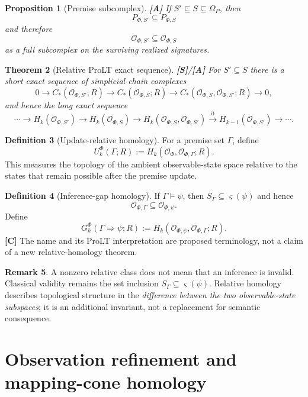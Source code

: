 \documentclass[11pt]{article}
\newtheorem{theorem}{Theorem}[section]
\newtheorem{proposition}[theorem]{Proposition}
\theoremstyle{definition}
\newtheorem{definition}[theorem]{Definition}
\newtheorem{remark}[theorem]{Remark}
\newcommand{\Om}{\Omega_P}
\newcommand{\truth}{\varsigma}
\newcommand{\OX}{\mathcal O}
\newcommand{\statusS}{\textbf{[S]}}
\newcommand{\statusA}{\textbf{[A]}}
\newcommand{\statusC}{\textbf{[C]}}
\begin{document}
\begin{proposition}[Premise subcomplex]\label{prop:premise}
\statusA\;
If $S'\subseteq S\subseteq\Om$, then
\[
P_{\Phi,S'}\subseteq P_{\Phi,S}
\]
and therefore
\[
\OX_{\Phi,S'}\subseteq\OX_{\Phi,S}
\]
as a full subcomplex on the surviving realized signatures.
\end{proposition}

\begin{theorem}[Relative ProLT exact sequence]\label{thm:relative}
\statusS/\statusA\;
For $S'\subseteq S$ there is a short exact sequence of simplicial chain complexes
\[
0\longrightarrow C_*(\OX_{\Phi,S'};R)
\longrightarrow C_*(\OX_{\Phi,S};R)
\longrightarrow C_*(\OX_{\Phi,S},\OX_{\Phi,S'};R)
\longrightarrow0,
\]
and hence the long exact sequence
\[
\cdots\to H_k(\OX_{\Phi,S'})\to H_k(\OX_{\Phi,S})
\to H_k(\OX_{\Phi,S},\OX_{\Phi,S'})
\overset{\partial}{\longrightarrow}H_{k-1}(\OX_{\Phi,S'})\to\cdots.
\]
\end{theorem}

\begin{definition}[Update-relative homology]
For a premise set $\Gamma$, define
\[
U_k^\Phi(\Gamma;R)
:=H_k(\OX_\Phi,\OX_{\Phi,\Gamma};R).
\]
This measures the topology of the ambient observable-state space relative to the states that remain possible after the premise update.
\end{definition}

\begin{definition}[Inference-gap homology]
If $\Gamma\models\psi$, then $S_\Gamma\subseteq\truth(\psi)$ and hence
\[
\OX_{\Phi,\Gamma}\subseteq\OX_{\Phi,\psi}.
\]
Define
\[
G_k^\Phi(\Gamma\Rightarrow\psi;R)
:=H_k(\OX_{\Phi,\psi},\OX_{\Phi,\Gamma};R).
\]
\statusC\; The name and its ProLT interpretation are proposed terminology, not a claim of a new relative-homology theorem.
\end{definition}

\begin{remark}
A nonzero relative class does not mean that an inference is invalid. Classical validity remains the set inclusion $S_\Gamma\subseteq\truth(\psi)$. Relative homology describes topological structure in the \emph{difference between the two observable-state subspaces}; it is an additional invariant, not a replacement for semantic consequence.
\end{remark}

\section{Observation refinement and mapping-cone homology}
\end{document}

